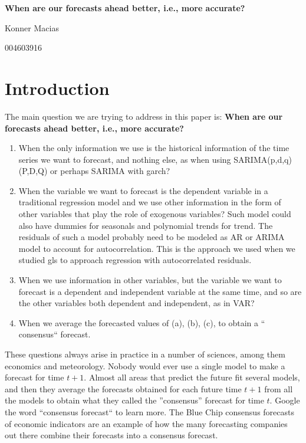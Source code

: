 \documentclass[11pt]{article}
\begin{document}
\begin{titlepage}
\begin{center}
\vspace*{8cm}

\textbf{When are our forecasts ahead better, i.e., more accurate?}

\vspace*{1.5cm}

Konner Macias

004603916
\end{center}
\end{titlepage}

\section{Introduction}

The main question we are trying to address in this paper is: \textbf{When are our forecasts ahead better, i.e., more accurate?}
\begin{enumerate}[label=(\alph*)]
\item When the only information we use is the historical information of the time series we want to forecast, and nothing else, as when using SARIMA(p,d,q)(P,D,Q) or perhaps SARIMA with garch? 
\item When the variable we want to forecast is the dependent variable in a traditional regression model and we use other information in the form of other variables that play the role of exogenous variables? Such model could also have dummies for seasonals and polynomial trends for trend. The residuals of such a model probably need to be modeled as AR or ARIMA model to account for autocorrelation. This is the approach we used when we studied gls to approach regression with autocorrelated residuals.
\item When we use information in other variables, but the variable we want to forecast is a dependent and independent variable at the same time, and so are the other variables both dependent and independent, as in VAR?
\item  When we average the forecasted values of (a), (b), (c), to obtain a “ consensus“ forecast.
\end{enumerate}
These questions always arise in practice in a number of sciences, among them economics and meteorology. Nobody would ever use a single model to make a forecast for time $t + 1$. Almost all areas that predict the future fit several models, and then they average the forecasts obtained for each future time $t + 1$ from all the models to obtain what they called the ”consensus” forecast for time $t$. Google the word “consensus forecast“ to learn more. The Blue Chip consensus forecasts of economic indicators are an example of how the many forecasting companies out there combine their forecasts into a consensus forecast.
\end{document}
